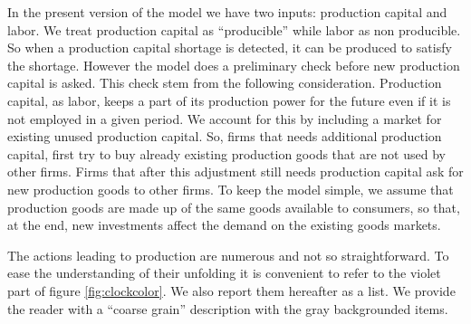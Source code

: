 \documentclass{book}
\begin{document}
\label{pg:inputs2}
In the present version of the model we have two inputs: production capital and labor. We treat production capital as ``producible'' while labor as non producible. So when a production capital shortage is detected, it can be produced to satisfy the shortage. However the model does a preliminary check before new production capital is asked. This check stem from the following consideration.  
Production capital, as labor, keeps a part of its production power for the future even if it is not employed in a given period. We account for this by including a market for existing unused production capital. So, firms that needs additional production capital, first try to buy already existing production goods that are not used by other firms. Firms that after this adjustment still needs production capital ask for new production goods to other firms. To keep the model simple, we assume that production goods are made up of the same goods available to consumers, so that, at the end, new investments affect the demand on the existing goods markets.



The actions leading to production are numerous and not so straightforward. To ease the understanding of their unfolding it is convenient to refer to the violet part of figure \ref{fig:clockcolor}. We also report them hereafter as a list. We provide the reader with a ``coarse grain'' description with the gray backgrounded items.
\end{document}
